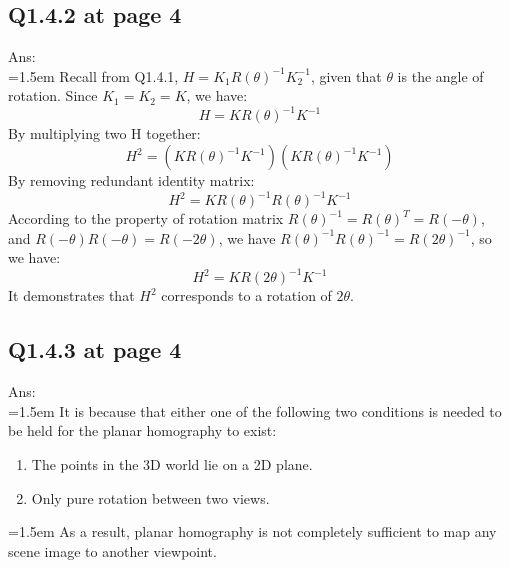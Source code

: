 \documentclass[12pt]{article}
\begin{document}
	\subsection*{Q1.4.2 at page 4}
	Ans:\\
	\hangindent=1.5em \hspace{1.5em} Recall from Q1.4.1, $H = K_1R(\theta)^{-1}K_2^{-1}$, given that $\theta$ is the angle of rotation. Since $K_1=K_2=K$, we have:
	\begin{equation}
		H = K R(\theta)^{-1} K^{-1}
	\end{equation}
	By multiplying two H together:
	\begin{equation}
		H^2 = (K R(\theta)^{-1} K^{-1})  (K R(\theta)^{-1} K^{-1})
	\end{equation}
	By removing redundant identity matrix:
	\begin{equation}
		H^2 = K R(\theta)^{-1} R(\theta)^{-1} K^{-1}
	\end{equation}
	According to the property of rotation matrix $R(\theta)^{-1}=R(\theta)^T=R(-\theta)$, and $R(-\theta) R(-\theta) = R(-2\theta)$, we have $R(\theta)^{-1} R(\theta)^{-1} = R(2\theta)^{-1}$, so we have:
	\begin{equation}
		H^2 = K R(2\theta)^{-1} K^{-1}
	\end{equation}
	It demonstrates that $H^2$ corresponds to a rotation of $2\theta$.
	
	\newpage
	\subsection*{Q1.4.3 at page 4}
	Ans:\\
	\hangindent=1.5em \hspace{1.5em} It is because that either one of the following two conditions is needed to be held for the planar homography to exist:
	\begin{enumerate}
		\item The points in the 3D world lie on a 2D plane.
		\item Only pure rotation between two views.
	\end{enumerate}
	\hangindent=1.5em \hspace{1.5em} As a result, planar homography is not completely sufficient to map any scene image to another viewpoint.
	
	\newpage
\end{document}
